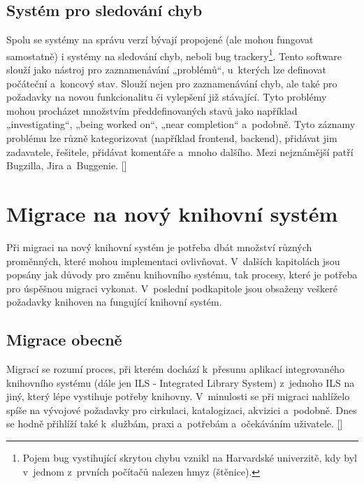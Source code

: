 \documentclass[
	11pt, oneside, printed, final, palatino, monochrome
	microtype,
	table,   %
	lof,     %
	lot     %
]{fithesis3}
\newcommand{\citepages}[2]{[\cite[#1]{#2}]}
\begin{document}
{\subsection{Systém pro sledování chyb}
Spolu se systémy na správu verzí bývají propojené (ale mohou fungovat samostatně) i systémy na sledování chyb, neboli bug trackery\footnote{Pojem bug vystihující skrytou chybu vznikl na Harvardské univerzitě, kdy byl v~jednom z~prvních počítačů nalezen hmyz (štěnice).}. Tento software slouží jako nástroj pro zaznamenávání „problémů“, u~kterých lze definovat počáteční a~koncový stav. Slouží nejen pro zaznamenávání chyb, ale také pro požadavky na novou funkcionalitu či vylepšení již stávající. Tyto problémy mohou procházet množstvím předdefinovaných stavů jako například „investigating“, „being worked on“, „near completion“ a~podobně. Tyto záznamy problému lze různě kategorizovat (například frontend, backend), přidávat jim zadavatele, řešitele, přidávat komentáře a~mnoho dalšího. Mezi nejznámější patří Bugzilla, Jira a~Buggenie. \citepages{99-104}{Fogel2012}

\section{Migrace na nový knihovní systém}

Při migraci na nový knihovní systém je potřeba dbát množství různých proměnných, které mohou implementaci ovlivňovat. V~dalších kapitolách jsou popsány jak důvody pro změnu knihovního systému, tak procesy, které je potřeba pro úspěšnou migraci vykonat. V~poslední podkapitole jsou obsaženy veškeré požadavky knihoven na fungující knihovní systém.  

\subsection{Migrace obecně}

Migrací se rozumí proces, při kterém dochází k~přesunu aplikací integrovaného knihovního systému (dále jen ILS - Integrated Library System) z~jednoho ILS na jiný, který lépe vystihuje potřeby knihovny. V~minulosti se při migraci nahlíželo spíše na vývojové požadavky pro cirkulaci, katalogizaci, akvizici a~podobně. Dnes se hodně přihlíží také k~službám, praxi a~potřebám a~očekáváním uživatele. \citepages{151-152}{bilal_2014}

}
\end{document}
